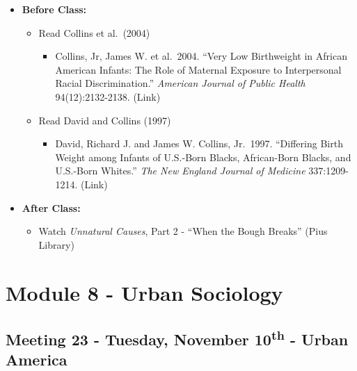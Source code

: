 \documentclass[
]{book}
\providecommand{\tightlist}{%
  \setlength{\itemsep}{0pt}\setlength{\parskip}{0pt}}
\begin{document}
\begin{itemize}
\tightlist
\item
  \textbf{Before Class:}

  \begin{itemize}
  \tightlist
  \item
    Read Collins et al.~(2004)

    \begin{itemize}
    \tightlist
    \item
      Collins, Jr, James W. et al.~2004. ``Very Low Birthweight in African American Infants: The Role of Maternal Exposure to Interpersonal Racial Discrimination.'' \emph{American Journal of Public Health} 94(12):2132-2138. (Link)
    \end{itemize}
  \item
    Read David and Collins (1997)

    \begin{itemize}
    \tightlist
    \item
      David, Richard J. and James W. Collins, Jr.~1997. ``Differing Birth Weight among Infants of U.S.-Born Blacks, African-Born Blacks, and U.S.-Born Whites.'' \emph{The New England Journal of Medicine} 337:1209-1214. (Link)
    \end{itemize}
  \end{itemize}
\item
  \textbf{After Class:}

  \begin{itemize}
  \tightlist
  \item
    Watch \emph{Unnatural Causes}, Part 2 - ``When the Bough Breaks'' (Pius Library)
  \end{itemize}
\end{itemize}

\newpage

\hypertarget{module-8---urban-sociology}{%
\section{Module 8 - Urban Sociology}\label{module-8---urban-sociology}}

\hypertarget{meeting-23---tuesday-november-10th---urban-america}{%
\subsection*{\texorpdfstring{Meeting 23 - Tuesday, November 10\textsuperscript{th} - Urban America}{Meeting 23 - Tuesday, November 10th - Urban America}}\label{meeting-23---tuesday-november-10th---urban-america}}
\end{document}
